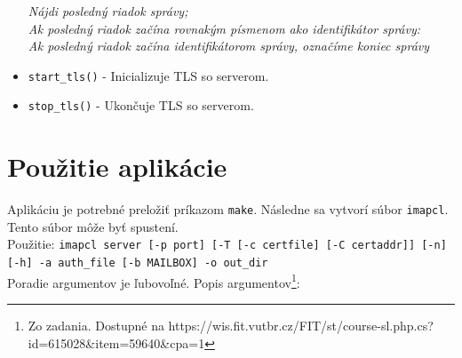 \documentclass{article}
\begin{document}
\begin{itemize}
\textit{
Nájdi posledný riadok správy;\\
Ak posledný riadok začína rovnakým písmenom ako identifikátor správy:\\
Ak posledný riadok začína identifikátorom správy, označíme koniec správy\\}
\item\texttt{start\_tls()} - Inicializuje TLS so serverom.\\
\item\texttt{stop\_tls()} - Ukončuje TLS so serverom.\\
\end{itemize}


\section{Použitie aplikácie}
Aplikáciu je potrebné preložiť príkazom \texttt{make}. Následne sa vytvorí súbor \texttt{imapcl}. Tento súbor môže byť spustení.\\
Použitie: \texttt{imapcl server [-p port] [-T [-c certfile] [-C certaddr]] [-n] [-h] -a auth\_file [-b MAILBOX] -o out\_dir}\\

Poradie argumentov je ľubovoľné. Popis argumentov\footnote{Zo zadania. Dostupné na https://wis.fit.vutbr.cz/FIT/st/course-sl.php.cs?id=615028\&item=59640\&cpa=1}:\\
\end{document}
